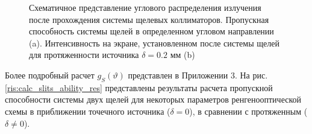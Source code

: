 \begin{figure}[H]
  \centering
  \hfill
  \caption{Схематичное представление углового распределения излучения после
  прохождения системы щелевых коллиматоров. Пропускная способность системы
  щелей в определенном угловом направлении (a).
   Интенсивность на экране, установленном после системы щелей для
   протяженности источника $\delta = 0.2$ мм (b)}
  \label{ris:how_many_quants_use_parallelogr}
\end{figure}
Более подробный расчет $g_S(\vartheta)$ представлен в Приложении 3.
На рис. \ref{ris:calc_slits_ability_res} представлены результаты расчета пропускной способности
системы двух щелей для некоторых параметров ренгенооптической схемы в приближении
 точечного источника ($\delta = 0$), в сравнении с протяженным ($\delta \neq 0$).

